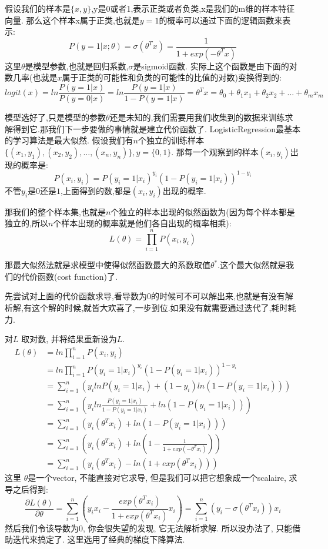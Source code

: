 假设我们的样本是$\{x, y\}$,y是0或者1,表示正类或者负类,x是我们的m维的样本特征向量.
那么这个样本x属于正类,也就是$y = 1$的概率可以通过下面的逻辑函数来表示:
$$
P(y = 1| x; \theta) = \sigma(\theta^T x) = \frac{1}{1 + exp(- \theta^T x)}
$$
这里$\theta$是模型参数,也就是回归系数,$\sigma$是sigmoid函数.
实际上这个函数是由下面的对数几率(也就是$x$属于正类的可能性和负类的可能性的比值的对数)变换得到的:
$$
log it(x)
= ln \frac{P(y = 1 | x)}{P(y = 0 | x)}
= ln \frac{P(y = 1 | x)}{1 - P(y = 1 | x)}
= \theta^T x
= \theta_0 + \theta_1 x_1 + \theta_2 x_2 + ... + \theta_m x_m
$$

模型选好了,只是模型的参数$\theta$还是未知的,我们需要用我们收集到的数据来训练求解得到它.那我们下一步要做的事情就是建立代价函数了.
LogisticRegression最基本的学习算法是最大似然.
假设我们有$n$个独立的训练样本$\{(x_1, y_1) ,(x_2, y_2), \ldots ,(x_n, y_n)\},y = \{0, 1\}$.
那每一个观察到的样本$(x_i, y_i)$出现的概率是:
$$
P(x_i, y_i) = P(y_i = 1 | x_i)^{y_i} (1 - P(y_i = 1 | x_i))^{1 - y_i}
$$
不管$y_i$是$0$还是$1$,上面得到的数,都是$(x_i, y_i)$出现的概率.

那我们的整个样本集,也就是$n$个独立的样本出现的似然函数为(因为每个样本都是独立的,所以$n$个样本出现的概率就是他们各自出现的概率相乘):
$$
L(\theta)
= \prod_{i = 1}^{n} P(x_i, y_i)
$$

那最大似然法就是求模型中使得似然函数最大的系数取值$\theta^*$.这个最大似然就是我们的代价函数(cost function)了.

先尝试对上面的代价函数求导,看导数为0的时候可不可以解出来,也就是有没有解析解,有这个解的时候,就皆大欢喜了,一步到位.如果没有就需要通过迭代了,耗时耗力.

对$L$ 取对数, 并将结果重新设为$L$.
$$
\begin{aligned}
L(\theta)
& = ln \prod_{i = 1}^{n} P(x_i, y_i) \\
& = ln \prod_{i = 1}^{n} P(y_i = 1 | x_i)^{y_i} (1 - P(y_i = 1 | x_i))^{1 - y_i} \\
& = \sum_{i = 1}^{n} (y_i ln P(y_i = 1 | x_i) + (1 - y_i) ln (1 - P(y_i = 1 | x_i))) \\
& = \sum_{i = 1}^{n} (y_i ln \frac{P(y_i = 1 | x_i)}{1 - P(y_i = 1 | x_i)} + ln (1 - P(y_i = 1 | x_i))) \\
& = \sum_{i = 1}^{n} (y_i (\theta^T x_i) + ln (1 - P(y_i = 1 | x_i))) \\
& = \sum_{i = 1}^{n} (y_i (\theta^T x_i) + ln (1 - \frac{1}{1 + exp(- \theta^T x_i)})) \\
& = \sum_{i = 1}^{n} (y_i (\theta^T x_i) - ln (1 + exp(\theta^T x_i)))
\end{aligned}
$$
这里 $\theta$是一个vector, 不能直接对它求导, 但是我们可以把它想象成一个scalaire, 求导之后得到:
$$
\frac{\partial L(\theta)}{\partial \theta}
= \sum_{i = 1}^n (y_i x_i - \frac{exp(\theta^T x_i)}{1 + exp(\theta^T x_i)} x_i)
= \sum_{i = 1}^n (y_i - \sigma(\theta^T x_i)) x_i
$$
然后我们令该导数为$0$, 你会很失望的发现, 它无法解析求解. 所以没办法了, 只能借助迭代来搞定了. 这里选用了经典的梯度下降算法.

